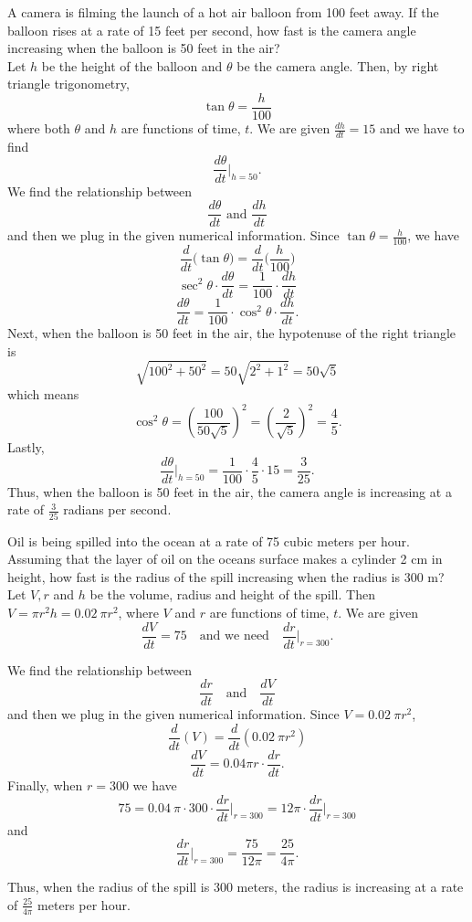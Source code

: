 \documentclass{ximera}
\begin{document}
\begin{example}
A camera is filming the launch of a hot air balloon from 100 feet away. 
If the balloon rises at a rate of 15 feet per second, how fast is the camera angle increasing when the balloon is 50 feet in the air?\\
Let $h$ be the height of the balloon and $\theta$ be the camera angle. Then, by right triangle trigonometry, 
\[\tan \theta  = \frac{h}{100}\]
where both $\theta$ and $h$ are functions of time, $t$.
We are given $\frac{dh}{dt} = 15$ and we have to find
\[\frac{d\theta}{dt}\bigg|_{h = 50}.\]
We find the relationship between 
\[\frac{d\theta}{dt} \text{ and } \frac{dh}{dt}\]
and then we plug in the given numerical information.
Since $\tan\theta = \frac{h}{100}$, we have
\[\frac{d}{dt}\big(\tan\theta\big) = \frac{d}{dt} \Big(\frac{h}{100}\Big)\]
 \[\sec^2 \theta \cdot \frac{d\theta}{dt} = \frac{1}{100} \cdot \frac{dh}{dt}\]
\[ \frac{d\theta}{dt} = \frac{1}{100}\cdot\cos^2 \theta  \cdot\frac{dh}{dt}.\]
Next, when the balloon is 50 feet in the air, the hypotenuse of the right triangle is 
\[\sqrt{100^2 + 50^2} = 50\sqrt{2^2 + 1^2} = 50\sqrt 5\]
which means 
\[\cos^2 \theta = \left(\frac{100}{50\sqrt 5}\right)^2 = \left(\frac{2}{\sqrt 5}\right)^2 = \frac45.\]
Lastly,
\[\frac{d\theta}{dt}\bigg|_{h = 50}= \frac{1}{100} \cdot \frac45 \cdot 15 = \frac{3}{25}.\]
Thus, when the balloon is 50 feet in the air, the camera angle is increasing at a rate of $\frac{3}{25}$ radians per second.
\end{example}



\begin{example}
Oil is being spilled into the ocean at a rate of 75 cubic meters per hour.  
Assuming that the layer of oil on the oceans surface makes a cylinder  2 cm in height, 
how fast is the radius of the spill increasing when the radius is 300 m?\\
Let $V, r$ and $h$ be the volume, radius and height of the spill.  Then $V = \pi r^2 h = 0.02 \ \pi r^2$,
where $V$ and $r$ are functions of time, $t$. We are given
\[\frac{dV}{dt} = 75 \quad \text{and we need} \quad \frac{dr}{dt}\bigg|_{r = 300}.\]

We find the relationship between 
\[\frac{dr}{dt} \quad \text{and}\quad \frac{dV}{dt}\]
and then we plug in the given numerical information.
Since $V =  0.02\  \pi r^2$,
\[\frac{d}{dt}(V) = \frac{d}{dt}(0.02 \ \pi r^2)\]
\[\frac{dV}{dt} = 0.04 \pi r \cdot \frac{dr}{dt}.\]
Finally, when $r = 300$ we have
\[75 = 0.04 \ \pi \cdot 300 \cdot \frac{dr}{dt}\bigg|_{r= 300} = 12 \pi \cdot \frac{dr}{dt}\bigg|_{r= 300} \]
and
\[\frac{dr}{dt}\bigg|_{r= 300} = \frac{75}{12\pi} = 
\frac{25}{4\pi}.\]





Thus, when the radius of the spill is 300 meters, the radius is increasing at a rate of $\frac{25}{4\pi}$ meters per hour.
\end{example}
\end{document}
